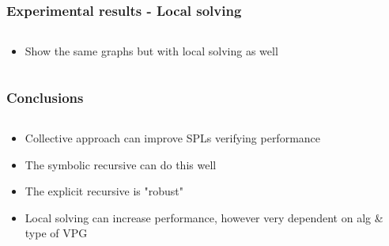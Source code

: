 \documentclass[aspectratio=169]{beamer}
\begin{document}

\begin{frame}[t]
\frametitle{Experimental results - Local solving}
\begin{columns}[t]
	\begin{column}{0.5\textwidth}
		\begin{itemize}
			\item Show the same graphs but with local solving as well
		\end{itemize}
	\end{column}
	\begin{column}{0.5\textwidth}
	\end{column}
\end{columns}
\end{frame}


\begin{frame}[t]
\frametitle{Conclusions}
\begin{columns}[t]
	\begin{column}{0.5\textwidth}
		\begin{itemize}
			\item Collective approach can improve SPLs verifying performance
			\item The symbolic recursive can do this well
			\item The explicit recursive is "robust"
			\item Local solving can increase performance, however very dependent on alg \& type of VPG
		\end{itemize}
	\end{column}
	\begin{column}{0.5\textwidth}
	\end{column}
\end{columns}
\end{frame}

\end{document}
